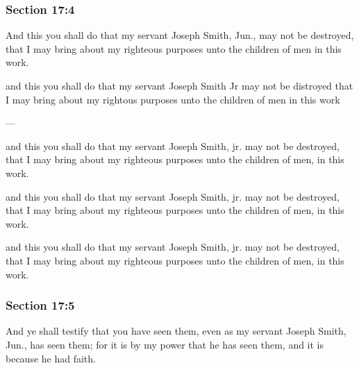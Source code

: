 	\subsubsection{Section 17:4} %
		\label{DC17-4}

		And this you shall do that my servant Joseph Smith, Jun., may not be destroyed, that I may bring about my righteous purposes unto the children of men in this work.

		\begin{framed}
		\scriptsize
			\begin{compactdesc}
				\item[JSP] and this you shall do that my servant Joseph Smith Jr may not be distroyed that I may bring about my rightous purposes unto the children of men in this work 
				\item[BC] --- 
				\item[MA] and this you shall do that my servant Joseph Smith, jr. may not be destroyed, that I may bring about my righteous purposes unto the children of men, in this work. 
				\item[DC 1835] and this you shall do that my servant Joseph Smith, jr. may not be destroyed, that I may bring about my righteous purposes unto the children of men, in this work. 
				\item[DC 1844] and this you shall do that my servant Joseph Smith, jr. may not be destroyed, that I may bring about my righteous purposes unto the children of men, in this work. 
			\end{compactdesc}
		\end{framed}

	\subsubsection{Section 17:5} %
		\label{DC17-5}

		And ye shall testify that you have seen them, even as my servant Joseph Smith, Jun., has seen them; for it is by my power that he has seen them, and it is because he had faith.

